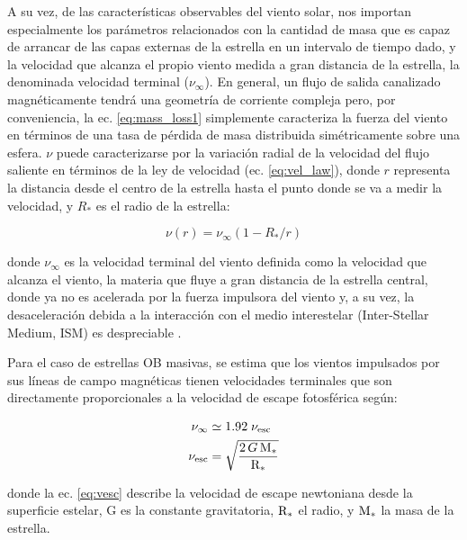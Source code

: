 A su vez, de las características observables del viento solar, nos importan especialmente los parámetros relacionados con la cantidad de masa que es capaz de arrancar de las capas externas de la estrella en un intervalo de tiempo dado, y la velocidad que alcanza el propio viento medida a gran distancia de la estrella, la denominada velocidad terminal ($\nu_\infty$). En general, un flujo de salida canalizado magnéticamente tendrá una geometría de corriente compleja pero, por conveniencia, la ec. \ref{eq:mass_loss1} simplemente caracteriza la fuerza del viento en términos de una tasa de pérdida de masa distribuida simétricamente sobre una esfera. $\nu$ puede caracterizarse por la variación radial de la velocidad del flujo saliente en términos de la ley de velocidad (ec. \ref{eq:vel_law}), donde $r$ representa la distancia desde el centro de la estrella hasta el punto donde se va a medir la velocidad, y $R_*$ es el radio de la estrella:\par

\begin{equation}
    \nu(r) = \nu_\infty (1-R_*/r) \label{eq:vel_law}
\end{equation}

donde $\nu_\infty$ es la velocidad terminal del viento definida como la velocidad que alcanza el viento, la materia que fluye a gran distancia de la estrella central, donde ya no es acelerada por la fuerza impulsora del viento y, a su vez, la desaceleración debida a la interacción con el medio interestelar (Inter-Stellar Medium, ISM) es despreciable \citep{Niedzielski2002}.\par

Para el caso de estrellas OB masivas, se estima que los vientos impulsados por sus líneas de campo magnéticas tienen velocidades terminales que son directamente proporcionales a la velocidad de escape fotosférica \citep{Lamers2000} según:\par

\begin{ceqn}
\begin{align}
    \nu_\infty &\simeq 1.92 \;\nu_{\textrm{esc}} \label{eq:vinf}\\
    \nu_{\textrm{esc}} &= \sqrt{\frac{2\,G\,\mathrm{M}_*}{\mathrm{R}_*}} \label{eq:vesc}
\end{align}
\end{ceqn}

donde la ec. \ref{eq:vesc} describe la velocidad de escape newtoniana desde la superficie estelar, G es la constante gravitatoria, ${\mathrm{R}_*}$ el radio, y ${\mathrm{M}_*}$ la masa de la estrella.

